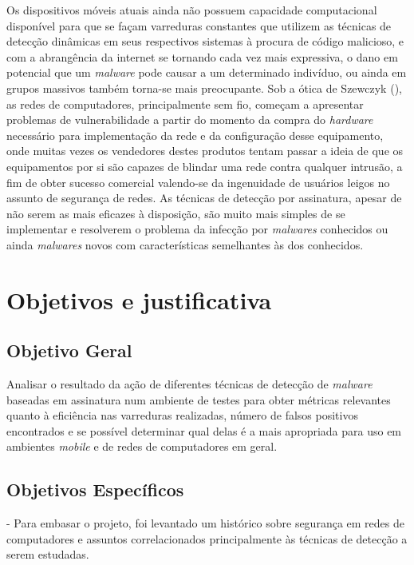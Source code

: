 Os dispositivos móveis atuais ainda não possuem capacidade computacional disponível para que se façam varreduras constantes que utilizem as técnicas de
detecção dinâmicas em seus respectivos sistemas à procura de código malicioso,
e com a abrangência da internet se tornando cada vez mais expressiva, o dano
em potencial que um \textit{malware} pode causar a um determinado indivíduo, ou ainda
em grupos massivos também torna-se mais preocupante. Sob a ótica de Szewczyk
(\citeyear{szewczyk12}), as redes de computadores, principalmente sem fio, começam a apresentar
problemas de vulnerabilidade a partir do momento da compra do \textit{hardware}
necessário para implementação da rede e da configuração desse equipamento,
onde muitas vezes os vendedores destes produtos tentam passar a ideia de que
os equipamentos por si são capazes de blindar uma rede contra qualquer
intrusão, a fim de obter sucesso comercial valendo-se da ingenuidade de
usuários leigos no assunto de segurança de redes. As técnicas de detecção por
assinatura, apesar de não serem as mais eficazes à disposição, são muito mais
simples de se implementar e resolverem o problema da infecção por \textit{malwares}
conhecidos ou ainda \textit{malwares} novos com características semelhantes às dos
conhecidos.

\section{Objetivos e justificativa}
\label{s.objetivos}

\subsection{Objetivo Geral}
\label{s.objetivog}

Analisar o resultado da ação de diferentes técnicas de detecção de \textit{malware}
baseadas em assinatura num ambiente de testes para obter métricas relevantes
quanto à eficiência nas varreduras realizadas, número de falsos positivos
encontrados e se possível determinar qual delas é a mais apropriada para uso
em ambientes \textit{mobile} e de redes de computadores em geral.
 
\subsection{Objetivos Específicos}
\label{s.ojetivosp}

- Para embasar o projeto, foi levantado um histórico sobre segurança em redes
  de computadores e assuntos correlacionados principalmente às técnicas de
  detecção a serem estudadas.

